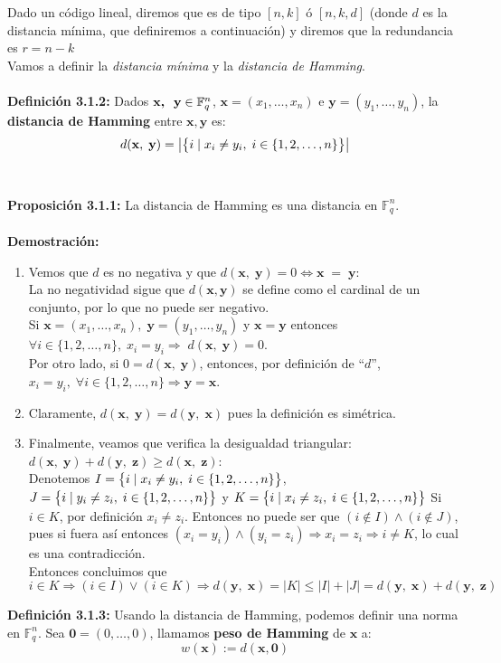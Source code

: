 \documentclass[11pt,spanish]{book}
\begin{document}
Dado un código lineal, diremos que es de tipo $[n,k]$ ó $[n,k,d]$ (donde $d$ es la distancia mínima, que definiremos a continuación) y diremos que la redundancia es $r=n-k$\\
Vamos a definir la \textit{distancia mínima} y la \textit{distancia de Hamming}.\\
\\ \textbf{Definición 3.1.2: } Dados $\textbf{x,\; y}\in \mathbb{F}_{q}^{n}$, $\textbf{x}=(x_{1},\ldots ,x_{n})$ e $\textbf{y}=(y_{1},\ldots ,y_{n})$, la \textbf{distancia de Hamming} entre $\mathbf{x, y}$ es:
$$d(\mathbf{x},\;\mathbf{y})=\big{|}\big{\{}i\;|\; x_{i}\neq y_{i}, \;i\in\{1,2,\ldots ,n\}\big{\}}\big{|}$$\\
\\ \textbf{Proposición 3.1.1: } La distancia de Hamming es una distancia en $\mathbb{F}_{q}^{n}$.\\
\\ \textbf{Demostración: }
\begin{enumerate}
    \item Vemos que $d$ es no negativa y que $d(\mathbf{x},\;\mathbf{y})=0\Longleftrightarrow \mathbf{x}\;=\;\mathbf{y}$:\\
    La no negatividad sigue que $d(\mathbf{x},\mathbf{y})$ se define como el cardinal de un conjunto, por lo que no puede ser negativo.\\
    Si $\mathbf{x}=(x_{1},\ldots ,x_{n}),\; \mathbf{y} = (y_{1},\ldots , y_{n})$ y $\mathbf{x}=\mathbf{y}$ entonces $\forall i\in\{1,2,\ldots ,n\},\; x_{i}=y_{i}\Rightarrow \;  d(\mathbf{x},\;\mathbf{y})= 0$.\\
    Por otro lado, si $0=d(\mathbf{x},\;\mathbf{y})$, entonces, por definición de ``$d$'', $x_{i} = y_{i},\;\forall i\in\{1,2,\ldots ,n\}\Rightarrow \textbf{y}=\textbf{x}$.
    \item Claramente, $d(\mathbf{x},\;\mathbf{y}) = d(\mathbf{y},\;\mathbf{x})$ pues la definición es simétrica.
    \item Finalmente, veamos que verifica la desigualdad triangular: $d(\mathbf{x},\;\mathbf{y})+d(\mathbf{y},\;\mathbf{z})\geq d(\mathbf{x},\;\mathbf{z})$:\\
    Denotemos $I=\big{\{}i\;|\; x_{i}\neq y_{i}, \;i\in\{1,2,\ldots ,n\}\big{\}}$, $J=\big{\{}i\;|\; y_{i}\neq z_{i}, \;i\in\{1,2,\ldots ,n\}\big{\}}$ y $K = \big{\{}i\;|\; x_{i}\neq z_{i}, \;i\in\{1,2,\ldots ,n\}\big{\}}$
    Si $i\in K$, por definición $x_{i}\neq z_{i}$. Entonces no puede ser que $(i\notin I)\land (i\notin J)$, pues si fuera así entonces $(x_{i}=y_{i})\land (y_{i}=z_{i})\Rightarrow x_{i}=z_{i}\Rightarrow i\neq K$, lo cual es una contradicción.\\
    Entonces concluimos que $$i\in K\Rightarrow (i\in I)\lor (i\in K)\Rightarrow d(\mathbf{y},\;\mathbf{x})=|K|\leq |I|+|J| = d(\mathbf{y},\;\mathbf{x}) + d(\mathbf{y},\;\mathbf{z}) $$
\end{enumerate}
\textbf{Definición 3.1.3: } Usando la distancia de Hamming, podemos definir una norma en $\mathbb{F}_{q}^{n}$. Sea $\mathbf{0}=(0,\ldots,0)$, llamamos \textbf{peso de Hamming} de $\textbf{x}$ a:
$$w(\mathbf{x}):=d(\mathbf{x}, \mathbf{0})$$
\end{document}
